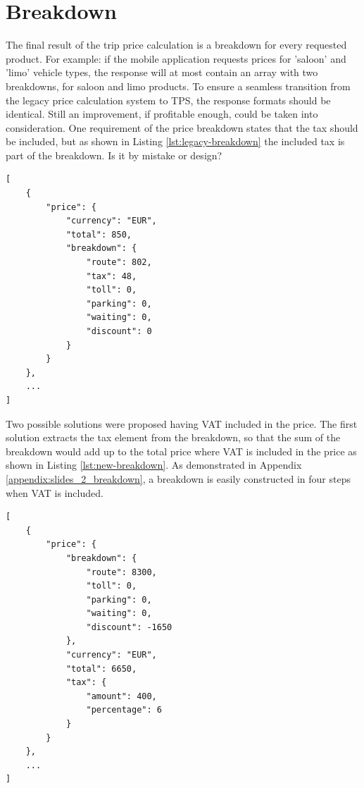 \section{Breakdown}
The final result of the trip price calculation is a breakdown for every requested product. For example: if the mobile application requests prices for 'saloon' and 'limo' vehicle types, the response will at most contain an array with two breakdowns, for saloon and limo products. To ensure a seamless transition from the legacy price calculation system to TPS, the response formats should be identical. Still an improvement, if profitable enough, could be taken into consideration. One requirement of the price breakdown states that the tax should be included, but as shown in Listing \ref{lst:legacy-breakdown} the included tax is part of the breakdown. Is it by mistake or design?

\begin{center}
\noindent\begin{minipage}{.85\textwidth}
\begin{lstlisting}[caption={Legacy price breakdown}, label={lst:legacy-breakdown}]
[
	{
		"price": {
			"currency": "EUR",
			"total": 850,
			"breakdown": {
				"route": 802,
				"tax": 48,
				"toll": 0,
				"parking": 0,
				"waiting": 0,
				"discount": 0
			}
		}
	},
	...
]
\end{lstlisting}
\end{minipage}
\end{center}

Two possible solutions were proposed having VAT included in the price. The first solution extracts the tax element from the breakdown, so that the sum of the breakdown would add up to the total price where VAT is included in the price as shown in Listing \ref{lst:new-breakdown}. As demonstrated in Appendix \ref{appendix:slides_2_breakdown}, a breakdown is easily constructed in four steps when VAT is included.

\begin{center}
\noindent\begin{minipage}{.85\textwidth}
\begin{lstlisting}[caption={Improved price breakdown}, label={lst:new-breakdown}]
[
	{
		"price": {
			"breakdown": {
				"route": 8300,
				"toll": 0,
				"parking": 0,
				"waiting": 0,
				"discount": -1650
			},
			"currency": "EUR",
			"total": 6650,
			"tax": {
				"amount": 400,
				"percentage": 6
			}
		}
	},
	...
]
\end{lstlisting}
\end{minipage}
\end{center}

